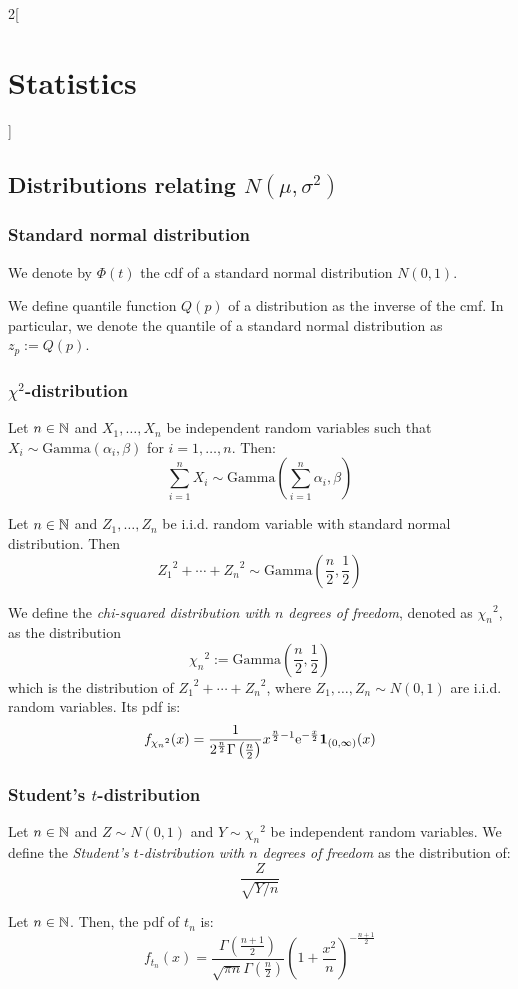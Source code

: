 \documentclass[../../../main.tex]{subfiles}
\begin{document}
\begin{multicols}{2}[\section{Statistics}]
  \subsection{Distributions relating \texorpdfstring{$N(\mu,\sigma^2)$}{N(mu,sigma2)}}
  \subsubsection{Standard normal distribution}
  \begin{definition}
    We denote by $\Phi(t)$ the cdf of a standard normal distribution $N(0,1)$.
  \end{definition}
  \begin{definition}[Quantile]
    We define quantile function $Q(p)$ of a distribution as the inverse of the cmf. In particular, we denote the quantile of a standard normal distribution as $z_p:=Q(p)$.
  \end{definition}
  \subsubsection{\texorpdfstring{$\chi^2$}{chi2}-distribution}
  \begin{definition}
    Let $n\in\mathbb{N}$ and $X_1,\ldots,X_n$ be independent random variables such that $X_i\sim \text{Gamma}(\alpha_i,\beta)$ for $i=1,\ldots,n$. Then: $$\sum_{i=1}^nX_i\sim\text{Gamma}\left(\sum_{i=1}^n\alpha_i,\beta\right)$$
  \end{definition}
  \begin{corollary}
    Let $n\in\mathbb{N}$ and $Z_1,\ldots,Z_n$ be i.i.d. random variable with standard normal distribution. Then $${Z_1}^2+\cdots+{Z_n}^2\sim\text{Gamma}\left(\frac{n}{2},\frac{1}{2}\right)$$
  \end{corollary}
  \begin{definition}
    We define the \emph{chi-squared distribution with $n$ degrees of freedom}, denoted as ${\chi_n}^2$, as the distribution $${\chi_n}^2:=\text{Gamma}\left(\frac{n}{2},\frac{1}{2}\right)$$ which is the distribution of ${Z_1}^2+\cdots+{Z_n}^2$, where $Z_1,\ldots,Z_n\sim N(0,1)$ are i.i.d. random variables. Its pdf is:
    $$f_{{\chi_n}^2}(x)=\frac{1}{2^\frac{n}{2}\Gamma\left(\frac{n}{2}\right)}x^{\frac{n}{2}-1}\mathrm{e}^{-\frac{x}{2}}\boldsymbol{\mathrm{1}}_{(0,\infty)}(x)$$
  \end{definition}
  \subsubsection{Student's \texorpdfstring{$t$}{t}-distribution}
  \begin{definition}
    Let $n\in\mathbb{N}$ and $Z\sim N(0,1)$ and $Y\sim{\chi_n}^2$ be independent random variables. We define the \emph{Student's $t$-distribution with $n$ degrees of freedom} as the distribution of: $$\frac{Z}{\sqrt{Y/n}}$$
  \end{definition}
  \begin{proposition}
    Let $n\in\mathbb{N}$. Then, the pdf of $t_n$ is: $$f_{t_n}(x)=\frac{\Gamma\left(\frac{n+1}{2}\right)}{\sqrt{\pi n}\Gamma\left(\frac{n}{2}\right)}{\left(1+\frac{x^2}{n}\right)}^{-\frac{n+1}{2}}$$
  \end{proposition}

\end{multicols}
\end{document}
